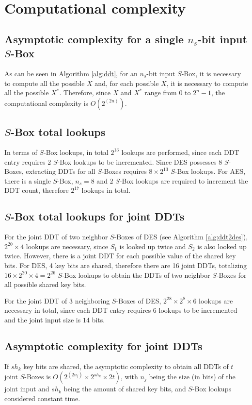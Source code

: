 \documentclass{report}
\begin{document}
\section{Computational complexity}

\subsection{Asymptotic complexity for a single $n_s$-bit input $S$-Box}

As can be seen in Algorithm \ref{alg:ddt}, for an $n_s$-bit input $S$-Box, it is necessary to compute all the possible $X$ and, for each possible $X$, it is necessary to compute all the possible $X^*$. Therefore, since $X$ and $X^*$ range from $0$ to $2^n - 1$, the computational complexity is $O(2^{(2n)})$. 

\subsection{$S$-Box total lookups}

In terms of $S$-Box lookups, in total $2^{13}$ lookups are performed, since each DDT entry requires $2$ $S$-Box lookups to be incremented. Since DES possesses $8$ $S$-Boxes, extracting DDTs for all $S$-Boxes requires $8 \times 2^{13}$ $S$-Box lookups. For AES, there is a single $S$-Box, $n_s = 8$ and $2$ $S$-Box lookups are required to increment the DDT count, therefore $2^{17}$ lookups in total.

\subsection{$S$-Box total lookups for joint DDTs}
For the joint DDT of two neighbor $S$-Boxes of DES (see Algorithm \ref{alg:ddt2des}), $2^{20} \times 4$ lookups are necessary, since $S_1$ is looked up twice and $S_2$ is also looked up twice. However, there is a joint DDT for each possible value of the shared key bits. For DES, 4 key bits are shared, therefore there are 16 joint DDTs, totalizing $16 \times 2^{20} \times 4 = 2^{26}$ $S$-Box lookups to obtain the DDTs of two neighbor $S$-Boxes for all possible shared key bits. 

For the joint DDT of 3 neighboring $S$-Boxes of DES, $2^{28} \times 2^{8} \times 6$ lookups are necessary in total, since each DDT entry requires 6 lookups to be incremented and the joint input size is $14$ bits.

\subsection{Asymptotic complexity for joint DDTs}
If $sh_k$ key bits are shared, the asymptotic complexity to obtain all DDTs of $t$ joint $S$-Boxes is $O(2^{(2n_j)} \times 2^{sh_k} \times 2t)$, with $n_j$ being the size (in bits) of the joint input and $sh_k$ being the amount of shared key bits, and $S$-Box lookups considered constant time.
\end{document}

